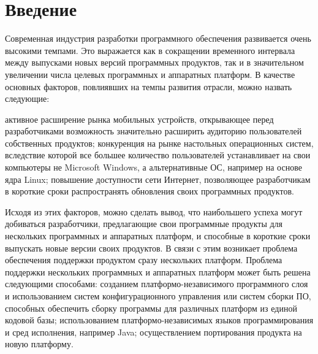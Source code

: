\section{Введение}
Современная индустрия разработки программного обеспечения развивается очень высокими темпами. Это выражается как в сокращении временного интервала между выпусками новых версий программных продуктов, так и в значительном увеличении числа целевых программных и аппаратных платформ. В качестве основных факторов, повлиявших на темпы развития отрасли, можно назвать следующие:

активное расширение рынка мобильных устройств, открывающее перед разработчиками возможность значительно расширить аудиторию пользователей собственных продуктов;
конкуренция на рынке настольных операционных систем, вследствие которой все большее количество пользователей устанавливает на свои компьютеры не Microsoft Windows, а альтернативные ОС, например на основе ядра Linux;
повышение доступности сети Интернет, позволяющее разработчикам в короткие сроки распространять обновления своих программных продуктов.

Исходя из этих факторов, можно сделать вывод, что наибольшего успеха могут добиваться разработчики, предлагающие свои программные продукты для нескольких программных и аппаратных платформ, и способные в короткие сроки выпускать новые версии своих продуктов. В связи с этим возникает проблема обеспечения поддержки продуктом сразу нескольких платформ.
Проблема поддержки нескольких программных и аппаратных платформ может быть решена следующими способами:
созданием платформо-независимого программного слоя и использованием систем конфигурационного управления или систем сборки ПО, способных обеспечить сборку программы для различных платформ из единой кодовой базы;
использованием платформо-независимых языков программирования и сред исполнения, например Java;
осуществлением портирования продукта на новую платформу.

